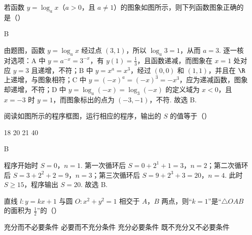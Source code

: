 \begin{problem}
若函数 \(y = \log_a x\)（\(a > 0\)，且 \(a \neq 1\)）的图象如图所示，则下列函数图象正确的是（\quad）


    {}
    {}
    {}
\end{problem}

\begin{answer}
B
\end{answer}

\begin{solution}
由题图，函数 \(y=\log_a x\) 经过点 \((3,1)\)，所以 \(\log_a3=1\)，从而 \(a=3\). 逐一核对选项：A 中 \(y=a^{-x}=3^{-x}\)，有 \(y(1)=\frac{1}{3}\)，且函数递减，而图象在 \(x=1\) 处对应 \(y=3\) 且递增，不符；B 中 \(y=x^a=x^3\)，经过 \((0,0)\) 和 \((1,1)\)，并且在 \(\R\) 上递增，与图象相符；C 中 \(y=(-x)^a=(-x)^3=-x^3\)，应为递减函数，图象却递增，不符；D 中 \(y=\log_a(-x)=\log_3(-x)\) 的定义域为 \(x<0\)，且 \(x=-3\) 时 \(y=1\)，而图象标出的点为 \((-3,-1)\)，不符. 故选 B.
\end{solution}

\begin{problem}
阅读如图所示的程序框图，运行相应的程序，输出的 \(S\) 的值等于（\quad）


\choices
    {18}
    {20}
    {21}
    {40}
\end{problem}

\begin{answer}
B
\end{answer}

\begin{solution}
程序开始时 \(S=0\)，\(n=1\). 第一次循环后 \(S=0+2^1+1=3\)，\(n=2\)；第二次循环后 \(S=3+2^2+2=9\)，\(n=3\)；第三次循环后 \(S=9+2^3+3=20\)，\(n=4\). 此时 \(S\geqslant15\)，程序输出 \(S=20\). 故选 B.
\end{solution}

\begin{problem}
直线 \(l: y = kx + 1\) 与圆 \(O: x^2 + y^2 = 1\) 相交于 \(A\)，\(B\) 两点，则“\(k = 1\)”是“\(\triangle OAB\) 的面积为 \(\frac{1}{2}\)”的（\quad）

\choices
    {充分而不必要条件}
    {必要而不充分条件}
    {充分必要条件}
    {既不充分又不必要条件}
\end{problem}


